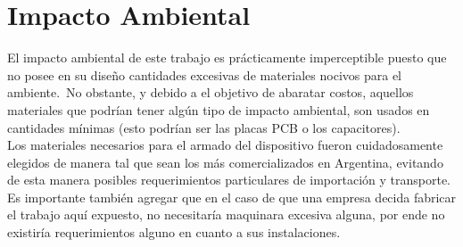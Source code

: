 \chapter{Impacto Ambiental}

El impacto ambiental de este trabajo es pr\'acticamente imperceptible puesto
que no posee en su dise\~no cantidades excesivas de materiales nocivos para
el ambiente.\
No obstante, y debido a el objetivo de abaratar costos, aquellos materiales
que podr\'ian tener alg\'un tipo de impacto ambiental, son usados en cantidades
m\'inimas (esto podr\'ian ser las placas PCB o los capacitores).\\

Los materiales necesarios para el armado del dispositivo fueron cuidadosamente
elegidos de manera tal que sean los m\'as comercializados en Argentina,
evitando de esta manera posibles requerimientos particulares de importaci\'on y
transporte.\\

Es importante tambi\'en agregar que en el caso de que una empresa decida
fabricar el trabajo aqu\'i expuesto, no necesitar\'ia maquinara excesiva
alguna,
por ende no existir\'ia requerimientos alguno en cuanto a sus instalaciones.